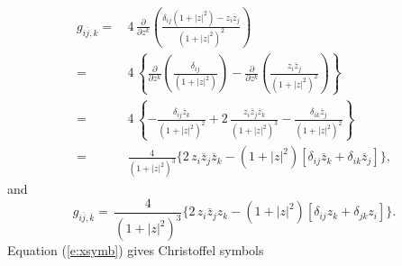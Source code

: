 \begin{equation}
\begin{split}
    g_{i\overline{j},k} =&\,4\, \frac{\partial}{\partial z^k} 
            \left(
                 \frac{\delta_{ij}\left( 1 + \left| z \right|^2 \right) - z_i\overline{z}_j }
                      { \left( 1 + \left| z\right|^2 \right)^2 }
            \right)\\
        =&\,4\, \left\lbrace
            \frac{\partial}{\partial z^k} \left(
                \frac{\delta_{ij}}{ \left( 1 + \left| z\right|^2 \right) }
            \right)
            - \frac{\partial}{\partial z^k} \left(
                \frac{z_i\overline{z}_j}{ 
                    \left( 1 + \left| z\right|^2 \right)^2 
                }
            \right)
        \right\rbrace\\
        =&\,4\,\left\lbrace
            -\frac{\delta_{ij}\overline{z}_k}{ 
                \left( 1 + \left| z\right|^2 \right)^2 
             }
            +2\,\frac{z_i\overline{z}_j\overline{z}_k}{
                    \left( 1 + \left| z\right|^2 \right)^3 
             }
            -\frac{\delta_{ik}\overline{z}_j}{ 
                \left( 1 + \left| z\right|^2 \right)^2 
             }
        \right\rbrace\\
        =&\,\frac{4}{
                \left( 1 + \left| z\right|^2 \right)^3 
            }
            \biggl\lbrace
                2\,z_i\overline{z}_j\overline{z}_k
                - \left( 1 + \left| z\right|^2 \right) \left[
                    \delta_{ij}\overline{z}_k 
                    + \delta_{ik}\overline{z}_j 
                \right]
            \biggr\rbrace,
\end{split}
\end{equation}
and
\begin{equation}
    g_{i\overline{j},\overline{k}} 
        =\,\frac{4}{
                \left( 1 + \left| z\right|^2 \right)^3 
            }
            \biggl\lbrace
                2\,z_i\overline{z}_jz_k
                - \left( 1 + \left| z\right|^2 \right) \left[
                    \delta_{ij}z_k 
                    + \delta_{jk}z_i 
                \right]
            \biggr\rbrace.
\end{equation}
Equation (\ref{e:xsymb}) gives Christoffel symbols
